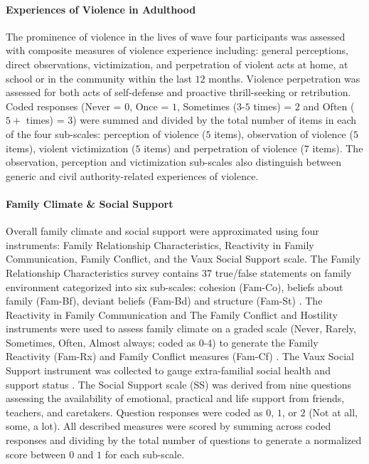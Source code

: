 \documentclass[utf8]{frontiersSCNS} %
\begin{document}
\paragraph{Experiences of Violence in Adulthood} The prominence of violence in the lives of wave four participants was assessed with composite measures of violence experience including: general perceptions, direct observations, victimization, and perpetration of violent acts at home, at school or in the community within the last $12$ months. Violence perpetration was assessed for both acts of self-defense and proactive thrill-seeking or retribution. Coded responses (Never = $0$, Once = $1$, Sometimes ($3$-$5$ times) = $2$ and Often ($5+$ times) = $3$) were summed and divided by the total number of items in each of the four sub-scales: perception of violence ($5$ items), observation of violence ($5$ items), violent victimization ($5$ items) and perpetration of violence ($7$ items). The observation, perception and victimization sub-scales also distinguish between generic and civil authority-related experiences of violence. 
\paragraph{Family Climate \& Social Support}
Overall family climate and social support were approximated using four instruments: Family Relationship Characteristics, Reactivity in Family Communication, Family Conflict, and the Vaux Social Support scale. The Family Relationship Characteristics survey contains $37$ true/false statements on family environment categorized into six sub-scales: cohesion (Fam-Co), beliefs about family (Fam-Bf), deviant beliefs (Fam-Bd) and structure (Fam-St) \citep{tolan1997assessment}. The Reactivity in Family Communication and The Family Conflict and Hostility instruments were used to assess family climate on a graded scale (Never, Rarely, Sometimes, Often, Almost always; coded as 0-4) to generate the Family Reactivity (Fam-Rx) and Family Conflict measures (Fam-Cf) \citep{thornberry2003gangs,henry2004study}. The Vaux Social Support instrument was collected to gauge extra-familial social health and support status \citep{vaux1988social}. The Social Support scale (SS) was derived from nine questions assessing the availability of emotional, practical and life support from friends, teachers, and caretakers. Question responses were coded as $0$, $1$, or $2$ (Not at all, some, a lot). All described measures were scored by summing across coded responses and dividing by the total number of questions to generate a normalized score between $0$ and $1$ for each sub-scale.
\end{document}
